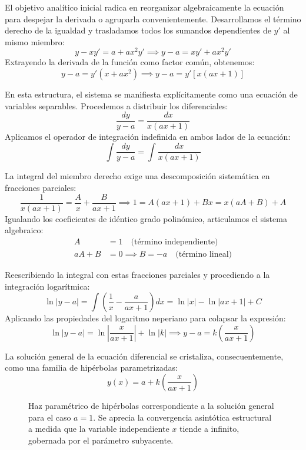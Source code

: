 \begin{tcolorbox}
El objetivo analítico inicial radica en reorganizar algebraicamente la ecuación para despejar la derivada o agruparla convenientemente. Desarrollamos el término derecho de la igualdad y trasladamos todos los sumandos dependientes de $y'$ al mismo miembro:
$$ y - xy' = a + ax^2y' \implies y - a = xy' + ax^2y' $$
Extrayendo la derivada de la función como factor común, obtenemos:
$$ y - a = y'(x + ax^2) \implies y - a = y'[x(ax + 1)] $$

En esta estructura, el sistema se manifiesta explícitamente como una ecuación de variables separables. Procedemos a distribuir los diferenciales:
$$ \frac{dy}{y - a} = \frac{dx}{x(ax + 1)} $$
Aplicamos el operador de integración indefinida en ambos lados de la ecuación:
$$ \int \frac{dy}{y - a} = \int \frac{dx}{x(ax + 1)} $$

La integral del miembro derecho exige una descomposición sistemática en fracciones parciales:
$$ \frac{1}{x(ax + 1)} = \frac{A}{x} + \frac{B}{ax + 1} \implies 1 = A(ax + 1) + Bx = x(aA + B) + A $$
Igualando los coeficientes de idéntico grado polinómico, articulamos el sistema algebraico:
\begin{align*}
    A &= 1 \quad \text{(término independiente)} \\
    aA + B &= 0 \implies B = -a \quad \text{(término lineal)}
\end{align*}

Reescribiendo la integral con estas fracciones parciales y procediendo a la integración logarítmica:
$$ \ln|y - a| = \int \left( \frac{1}{x} - \frac{a}{ax + 1} \right) dx = \ln|x| - \ln|ax + 1| + C $$
Aplicando las propiedades del logaritmo neperiano para colapsar la expresión:
$$ \ln|y - a| = \ln\left| \frac{x}{ax + 1} \right| + \ln|k| \implies y - a = k \left( \frac{x}{ax + 1} \right) $$

La solución general de la ecuación diferencial se cristaliza, consecuentemente, como una familia de hipérbolas parametrizadas:
$$ y(x) = a + k \left( \frac{x}{ax + 1} \right) $$

\begin{figure}[H]
    \centering
    
    \caption{Haz paramétrico de hipérbolas correspondiente a la solución general para el caso $a=1$. Se aprecia la convergencia asintótica estructural a medida que la variable independiente $x$ tiende a infinito, gobernada por el parámetro subyacente.}
\end{figure}
\end{tcolorbox}

